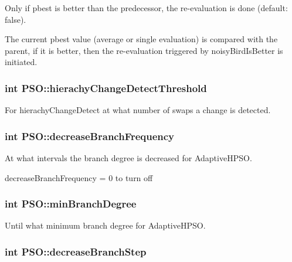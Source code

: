 Only if pbest is better than the predecessor, the re-evaluation is done (default: false). 

The current pbest value (average or single evaluation) is compared with the parent, if it is better, then the re-evaluation triggered by noisyBirdIsBetter is initiated. \hypertarget{classPSO_d0a0b95f85244023677a1420d4b5b54d}{
\subsubsection{\setlength{\rightskip}{0pt plus 5cm}int {\bf PSO::hierachyChangeDetectThreshold}}}
\label{classPSO_d0a0b95f85244023677a1420d4b5b54d}


For hierachyChangeDetect at what number of swaps a change is detected. 

\hypertarget{classPSO_02c898975f3d13ed115abee7002ca3bb}{
\subsubsection{\setlength{\rightskip}{0pt plus 5cm}int {\bf PSO::decreaseBranchFrequency}}}
\label{classPSO_02c898975f3d13ed115abee7002ca3bb}


At what intervals the branch degree is decreased for AdaptiveHPSO. 

decreaseBranchFrequency = 0 to turn off \hypertarget{classPSO_67940901b983c941c48de0a5a7b455bb}{
\subsubsection{\setlength{\rightskip}{0pt plus 5cm}int {\bf PSO::minBranchDegree}}}
\label{classPSO_67940901b983c941c48de0a5a7b455bb}


Until what minimum branch degree for AdaptiveHPSO. 

\hypertarget{classPSO_1eabafb61d709a3185b3465e104a189e}{
\subsubsection{\setlength{\rightskip}{0pt plus 5cm}int {\bf PSO::decreaseBranchStep}}}
\label{classPSO_1eabafb61d709a3185b3465e104a189e}


